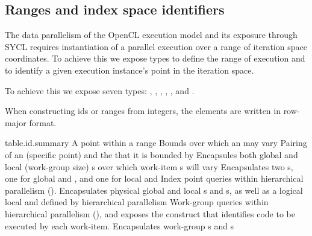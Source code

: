 

\subsection{Ranges and index space identifiers}
\label{ranges-identifiers}

The data parallelism of the OpenCL execution model and its exposure
through SYCL requires instantiation of a parallel execution over a
range of iteration space coordinates. To achieve this we expose types
to define the range of execution and to identify a given execution
instance's point in the iteration space.

To achieve this we expose seven types: ,
, , , ,
 and .

When constructing ids or ranges from integers, the elements are
written in row-major format.

{table.id.summary}
   {A point within a range}
   {Bounds over which an  may vary}
   {Pairing of an  (specific point) and the  that it is bounded by}
   {Encapsules both global and local (work-group size) \mbox{s} over which work-item \mbox{s} will vary}
   {Encapsulates two \mbox{s}, one for global  and , and one for local  and }
   {Index point queries within hierarchical parallelism ().  Encapsulates physical global and local \mbox{s} and \mbox{s}, as well as a logical local  and  defined by hierarchical parallelism}
   {Work-group queries within hierarchical parallelism (), and exposes the  construct that identifies code to be executed by each work-item.  Encapsulates work-group \mbox{s} and \mbox{s}}
\completeTable

